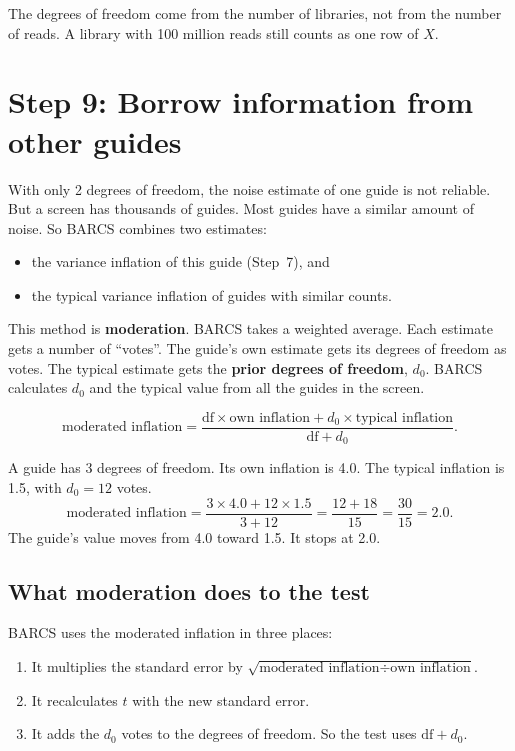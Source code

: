 \documentclass[12pt]{article}
\begin{document}
\begin{remember}
The degrees of freedom come from the number of libraries, not from the
number of reads. A library with 100 million reads still counts as one row
of $X$.
\end{remember}

\section{Step 9: Borrow information from other guides}

With only 2 degrees of freedom, the noise estimate of one guide is not
reliable. But a screen has thousands of guides. Most guides have a similar
amount of noise. So BARCS combines two estimates:

\begin{itemize}
\item the variance inflation of this guide (Step~7), and
\item the typical variance inflation of guides with similar counts.
\end{itemize}

This method is \textbf{moderation}. BARCS takes a weighted average. Each
estimate gets a number of ``votes''. The guide's own estimate gets its
degrees of freedom as votes. The typical estimate gets the \textbf{prior
degrees of freedom}, $d_0$. BARCS calculates $d_0$ and the typical value
from all the guides in the screen.

\[
\text{moderated inflation} =
\frac{\text{df} \times \text{own inflation} + d_0 \times
\text{typical inflation}}{\text{df} + d_0}.
\]

\begin{worked}
A guide has 3 degrees of freedom. Its own inflation is 4.0. The typical
inflation is 1.5, with $d_0 = 12$ votes.
\[
\text{moderated inflation} = \frac{3 \times 4.0 + 12 \times 1.5}{3 + 12}
 = \frac{12 + 18}{15} = \frac{30}{15} = 2.0.
\]
The guide's value moves from 4.0 toward 1.5. It stops at 2.0.
\end{worked}

\subsection{What moderation does to the test}

BARCS uses the moderated inflation in three places:
\begin{enumerate}
\item It multiplies the standard error by
  $\sqrt{\text{moderated inflation} \div \text{own inflation}}$.
\item It recalculates $t$ with the new standard error.
\item It adds the $d_0$ votes to the degrees of freedom. So the test uses
  $\text{df} + d_0$.
\end{enumerate}
\end{document}

